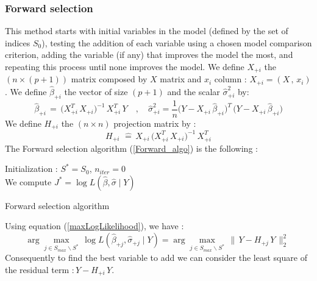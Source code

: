 \subsubsection{Forward selection}
This method starts with initial variables in the model (defined by the set of indices $S_0$), testing the addition of each variable
using a chosen model comparison criterion, adding the variable (if any) that improves the model the most, and repeating this process until none improves the model.
We define $X_{+i}$ the $(n \times (p+1))$ matrix composed by $X$ matrix and $x_i$ column : $X_{+i} = (X \,,\,x_i)$.
We define $\hat{\beta}_{+i}$ the vector of size $(p+1)$ and the scalar $\hat{\sigma}_{+i}^2$ by:
 \begin{equation}
  \hat{\beta}_{+i} \,=\, \big(X^T_{+i} \,X_{+i}\big)^{-1} \,X^T_{+i} \, Y
\quad,\quad
\hat{\sigma}_{+i}^2 = \frac{1}{n}\big(Y-X_{+i} \,\hat{\beta}_{+i}\big)^T\,\big(Y-X_{+i} \,\hat{\beta}_{+i}\big)
\end{equation}
We define $H_{+i} $ the $(n\times n)$ projection matrix by :
 \begin{equation}
\label{H+}
H_{+i}\, \,\hat{=} \, X_{+i}\,\big(X^T_{+i} \,X_{+i}\big)^{-1} \,X^T_{+i}
 \end{equation}
The Forward selection algorithm (\ref{Forward_algo}) is the following :
\begin{algorithm}
\label{Forward_algo}
Initialization : $S^* = S_0$, $n_{iter} = 0 $\\
We compute $J^* = \log L(\hat{\beta},\hat{\sigma}\mid Y)$  \\
\caption{Forward selection algorithm }
\end{algorithm}

Using equation (\ref{maxLogLikelihood}), we have :
 \begin{equation}
\arg   \displaystyle\max_{j \in S_{max} \backslash S^*}\,  \log L(\hat{\beta}_{+j},\hat{\sigma}_{+j}\mid Y) =
\arg \displaystyle\max_{j \in S_{max} \backslash S^*}\, \|\,Y-H_{+j}\,Y\,\|^2_2  \,\,
 \end{equation}
 Consequently to find the best variable to add we can consider the least square of the residual term $:Y-H_{+i}\,Y$.






